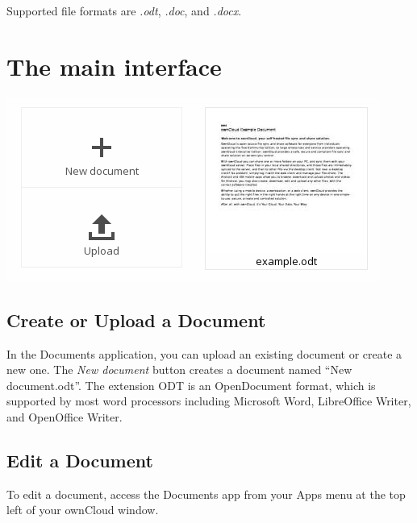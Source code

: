\documentclass[letterpaper,10pt,english]{sphinxmanual}
\begin{document}
Supported file formats are \emph{.odt}, \emph{.doc}, and \emph{.docx}.


\section{The main interface}
\label{documents:the-main-interface}
\includegraphics{oc_documents.png}


\subsection{Create or Upload a Document}
\label{documents:create-or-upload-a-document}
In the Documents application, you can upload an existing document or create a
new one. The \emph{New document} button creates a document named ``New
document.odt''. The extension ODT is an OpenDocument format, which is supported
by most word processors including Microsoft Word, LibreOffice Writer, and
OpenOffice Writer.


\subsection{Edit a Document}
\label{documents:edit-a-document}
To edit a document, access the Documents app from your Apps menu at the top
left of your ownCloud window.
\end{document}
